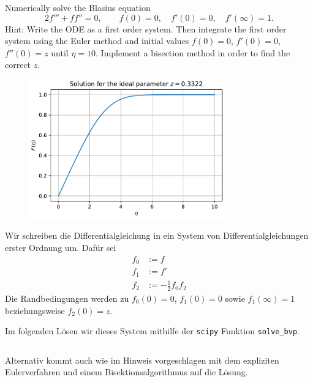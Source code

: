 \documentclass[12pt]{exam}
\begin{document}
\begin{questions}
    
    \question Numerically solve the Blasius equation
    \begin{equation*}
        2 f''' + ff'' = 0, \qquad f(0) = 0, \quad f'(0) = 0, \quad f'(\infty) = 1.
    \end{equation*}
    Hint: Write the ODE as a first order system. Then integrate the first order system using the Euler method and initial values $f(0) = 0$, $f'(0) = 0$, $f''(0) = z$ until $\eta = 10$. Implement a bisection method in order to find the correct $z$.
    
    \begin{figure}[!htbp]
        \centering
        \includegraphics[width=0.75\textwidth]{plot_blasius_equation.pdf}
        \label{fig:blasius_solution}
    \end{figure}

    \begin{solution}
    Wir schreiben die Differentialgleichung in ein System von Differentialgleichungen erster Ordnung um. Dafür sei
    \begin{align*}
        f_0 &:= f \\
        f_1 &:= f' \\
        f_2 &:= -\frac{1}{2} f_0 f_2
    \end{align*}
    Die Randbedingungen werden zu $f_0(0) = 0$, $f_1(0) = 0$ sowie $f_1(\infty) = 1$ beziehungsweise $f_2(0) = z$.
    
    Im folgenden Lösen wir dieses System mithilfe der \texttt{scipy} Funktion \texttt{solve\_bvp}.
    \inputminted[breaklines, fontsize=\small, firstline=1, lastline=26]{python}{blasius_equation.py}
    
    Alternativ kommt auch wie im Hinweis vorgeschlagen mit dem expliziten Eulerverfahren und einem Bisektionsalgorithmus auf die Lösung.
    \inputminted[breaklines, fontsize=\small, firstline=38, lastline=75]{python}{blasius_equation.py}
    

\end{solution}
\end{questions}
\end{document}
